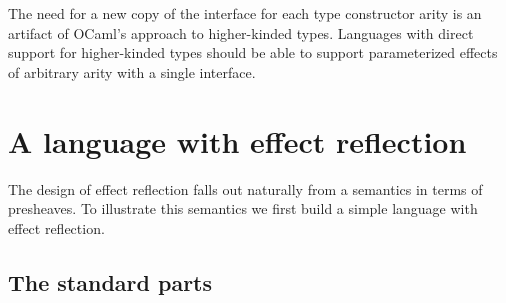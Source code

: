 \documentclass[acmsmall, screen, nonacm]{acmart}
\theoremstyle{definition}
\begin{document}
The need for a new copy of the interface for each type constructor arity
is an artifact of OCaml's approach to higher-kinded types. Languages
with direct support for higher-kinded types should be able to support
parameterized effects of arbitrary arity with a single interface.

\section{A language with effect reflection}
\label{sec:language}

The design of effect reflection falls out naturally from a semantics in
terms of presheaves. To illustrate this semantics we first build a
simple language with effect reflection.

\subsection{The standard parts}
\end{document}

